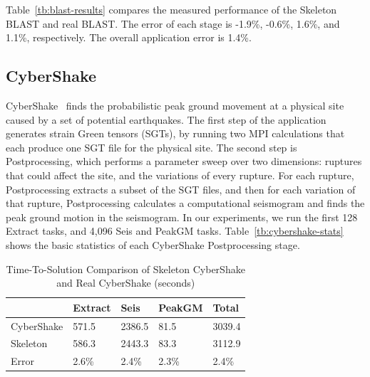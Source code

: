 \documentclass[preprint,12pt]{elsarticle}
\newcommand{\zhaonote}[1]{{\textcolor{darkgreen}{ ***Zhao:  #1 }}}
\newcommand{\zhaonote}[1]{}
\begin{document}
Table~\ref{tb:blast-results} compares the measured performance of the Skeleton BLAST and real BLAST.
The error of each stage is -1.9\%, -0.6\%, 1.6\%, and 1.1\%, respectively. 
The overall application error is 1.4\%.

\subsection{CyberShake}


CyberShake~\cite{SCEC07, SCEC10} finds the probabilistic peak ground movement at a physical site caused by a set of potential earthquakes. The first step of the application generates strain Green tensors (SGTs), by running two MPI calculations that each produce one SGT file for the physical site. The second step is Postprocessing, which performs a parameter sweep over two dimensions: ruptures that could affect the site, and the variations of every rupture. For each rupture, Postprocessing extracts a subset of the SGT files, and then for each variation of that rupture, Postprocessing calculates a computational seismogram and finds the peak ground motion in the seismogram.
In our experiments, we run the first 128 Extract tasks, and 4,096 Seis and PeakGM tasks.
Table~\ref{tb:cybershake-stats} shows the basic statistics of each CyberShake Postprocessing stage. 

\begin{table}[t]
\begin{center}
    \caption{Time-To-Solution Comparison of Skeleton CyberShake and Real CyberShake (seconds)}
    \begin{scriptsize}
    \begin{tabular}{ | p{1.5cm} | p{1cm} | p{1cm} | p{1.2cm} | p{1cm} | }
    \hline
	& Extract & Seis & PeakGM & Total \\ \hline \hline
	CyberShake & 571.5 & 2386.5 & 81.5 & 3039.4 \\ \hline
	Skeleton & 586.3 & 2443.3 & 83.3 & 3112.9 \\ \hline
	Error & 2.6\% & 2.4\% & 2.3\% & 2.4\% \\ \hline
    \end{tabular}
    \end{scriptsize}
    \label{tb:cybershake-results}
\end{center}   
\end{table}
\end{document}
